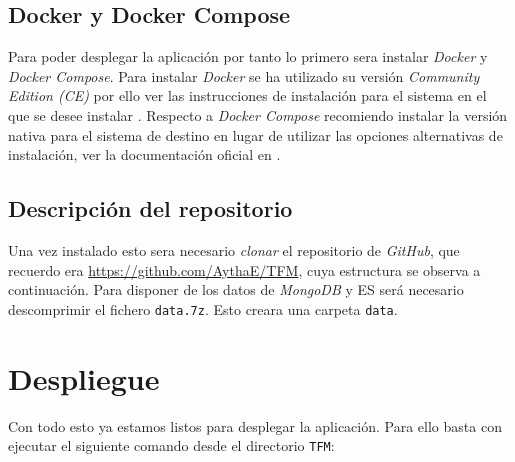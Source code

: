 \subsection{Docker y Docker Compose}
Para poder desplegar la aplicación por tanto lo primero sera instalar \textit{Docker} y \textit{Docker Compose}. Para instalar \textit{Docker} se ha utilizado su versión \textit{Community Edition (CE)} por ello ver las instrucciones de instalación para el sistema en el que se desee instalar \cite{dockerInstall}. Respecto a \textit{Docker Compose} recomiendo instalar la versión nativa para el sistema de destino en lugar de utilizar las opciones alternativas de instalación, ver la documentación oficial en \cite{dockerComposeInstall}.

\newpage

\subsection{Descripción del repositorio}
Una vez instalado esto sera necesario \textit{clonar} el repositorio de \textit{GitHub}, que recuerdo era \url{https://github.com/AythaE/TFM}, cuya estructura se observa a continuación. Para disponer de los datos de \textit{MongoDB} y \acrlong{ES} será necesario descomprimir el fichero \texttt{data.7z}. Esto creara una carpeta \texttt{data}.


\section{Despliegue}
Con todo esto ya estamos listos para desplegar la aplicación. Para ello basta con ejecutar el siguiente comando desde el directorio \texttt{TFM}:

